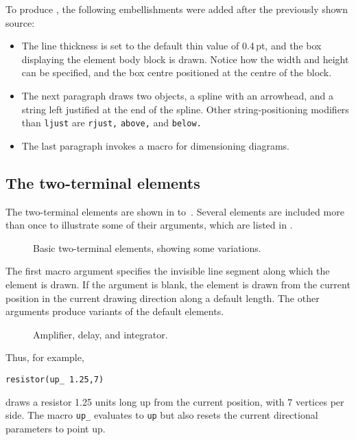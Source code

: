 To produce , the following embellishments
were added after the previously shown source:
{\small  }

\begin{itemize}
\item The line thickness is set to the default thin value of \hbox{0.4\,pt},
   and the box displaying the element body block is drawn.  Notice how the
   width and height can be specified, and the box centre positioned at
   the centre of the block.
\item The next paragraph draws two objects, a spline with an arrowhead,
   and a string left justified at the end of the spline.  Other
   string-positioning modifiers than {\tt ljust} are {\tt rjust,}
   {\tt above,} and {\tt below.}

\item The last paragraph invokes a macro for dimensioning diagrams.
   \end{itemize}

\subsection{The two-terminal elements\label{Twoterminal:}}
The two-terminal elements are shown in 
to~.
Several elements are included more than once to illustrate
some of their arguments, which are listed in .
\enlargethispage{\baselineskip}
\begin{figure}[h!]
   
   \caption{Basic two-terminal elements, showing some variations.}
   \label{CctTable}
    \end{figure}

The first macro argument specifies
the invisible line segment along which the element is drawn.
If the argument is blank,
the element is drawn from the current position in the current drawing
direction along a default length.
The other arguments produce variants of the default elements.
\begin{figure}[ht]
   
   \caption{Amplifier, delay, and integrator.}
   \label{AmpTable}
   \end{figure}

\pagebreak
Thus, for example,
\par
{\tt resistor(up\_ 1.25,7)}
\par
\noindent%
draws a resistor 1.25 units long up from the current position, with $7$
vertices per side.
The macro {\tt up\_} evaluates to {\tt up} but also resets the current
directional parameters to point up.

